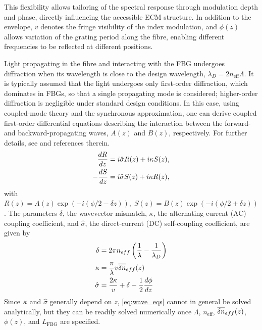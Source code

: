 This flexibility allows tailoring of the spectral response through modulation depth and phase, directly influencing the accessible ECM structure.
In addition to the envelope, $v$ denotes the fringe visibility of the index modulation, and $\phi(z)$ allows variation of the grating period along the fibre, enabling different frequencies to be reflected at different positions.
%
\par
%
Light propagating in the fibre and interacting with the FBG undergoes diffraction when its wavelength is close to the design wavelength, $\lambda_D = 2 n_{\text{eff}} \Lambda$.
It is typically assumed that the light undergoes only first-order diffraction, which dominates in FBGs, so that a single propagating mode is considered; higher-order diffraction is negligible under standard design conditions.
In this case, using coupled-mode theory and the synchronous approximation, one can derive coupled first-order differential equations describing the interaction between the forward- and backward-propagating waves, $A(z)$ and $B(z)$, respectively.
For further details, see \cite{erdogan1997fiber} and references therein.
%
\begin{equation}
\label{eq:wave_eqs}
    \begin{aligned}
        \frac{dR}{dz} &= i \hat{\sigma} R(z) + i \kappa S(z), \\
        -\frac{dS}{dz} &= i \hat{\sigma} S(z) + i \kappa R(z),
    \end{aligned}
\end{equation}
%
with $R(z) = A(z) \exp{ \left( -i \left( \phi/2 -\delta z \right) \right) }, \; S(z) = B(z) \exp{ \left( -i \left( \phi/2 + \delta z \right) \right) }$.
The parameters $\delta$, the wavevector mismatch, $\kappa$, the alternating-current (AC) coupling coefficient, and $\hat{\sigma}$, the direct-current (DC) self-coupling coefficient, are given by
%
\begin{align}
    \label{eq:delta}
    \delta &= 2 \pi n_{eff} \left( \frac{1}{\lambda} - \frac{1}{\lambda_D} \right) \\
    \label{eq:kappa}
    \kappa &= \frac{\pi}{\lambda} v \overline{\delta n}_{eff}(z)\\
    \label{eq:sigma}
    \hat{\sigma} &= \frac{2\kappa}{v} + \delta -\frac{1}{2}\frac{d\phi}{dz}
\end{align}
%
Since $\kappa$ and $\hat{\sigma}$ generally depend on $z$, \eqref{eq:wave_eqs} cannot in general be solved analytically, but they can be readily solved numerically once $\Lambda$, $n_{\text{eff}}$, $\overline{\delta n}_{eff}(z)$, $\phi(z)$, and $L_\text{FBG}$ are specified.

